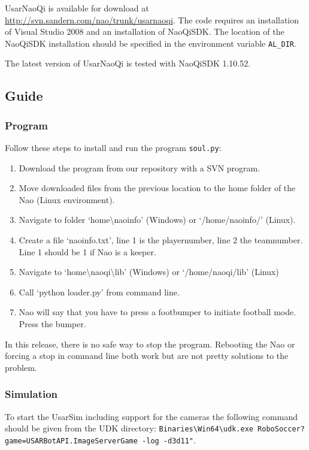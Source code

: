 \documentclass[11pt,a4paper,oneside]{article}
\begin{document}
UsarNaoQi is available for download at \url{http://svn.sandern.com/nao/trunk/usarnaoqi}. The code requires an installation of Visual Studio 2008 and an installation of NaoQiSDK. The location of the NaoQiSDK installation should be specified in the environment variable \texttt{AL\_DIR}.

The latest version of UsarNaoQi is tested with NaoQiSDK 1.10.52.

\subsection{Guide}
\subsubsection{Program}
Follow these steps to install and run the program \texttt{soul.py}:
\begin{enumerate}
\item Download the program from our repository with a SVN program.
\item Move downloaded files from the previous location to the home folder of the Nao (Linux environment).
\item Navigate to folder `home\textbackslash naoinfo' (Windows) or `/home/naoinfo/' (Linux). 
\item Create a file `naoinfo.txt', line 1 is the playernumber, line 2 the teamnumber. Line 1 should be 1 if Nao is a keeper.
\item Navigate to `home\textbackslash naoqi\textbackslash lib' (Windows) or `/home/naoqi/lib' (Linux)
\item Call `python loader.py' from command line.
\item Nao will say that you have to press a footbumper to initiate football mode. Press the bumper.
\end{enumerate}
In this release, there is no safe way to stop the program. Rebooting the Nao or forcing a stop in command line both work but are not pretty solutions to the problem.

\subsubsection{Simulation}
To start the UsarSim including support for the cameras the following command should be given from the UDK directory: \texttt{Binaries\textbackslash Win64\textbackslash udk.exe RoboSoccer?game=USARBotAPI.ImageServerGame -log -d3d11"}.
\end{document}
